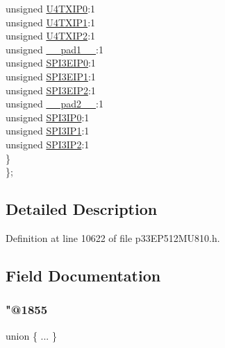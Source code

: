 \begin{DoxyCompactItemize}
\begin{tabbing}
\>\>unsigned \hyperlink{structtag_i_p_c22_b_i_t_s_a85fc1a35056957cd0698f120766a5260}{U4TXIP0}:1\\
\>\>unsigned \hyperlink{structtag_i_p_c22_b_i_t_s_a0818894982fdd0ef5b71a633006c59a1}{U4TXIP1}:1\\
\>\>unsigned \hyperlink{structtag_i_p_c22_b_i_t_s_af0e3e8902eb98b10e5a62a28d39ac00f}{U4TXIP2}:1\\
\>\>unsigned \hyperlink{structtag_i_p_c22_b_i_t_s_acaf2d0924a107ec6e8d2e31febaf66f9}{\_\_pad1\_\_}:1\\
\>\>unsigned \hyperlink{structtag_i_p_c22_b_i_t_s_a724371bf761601c78815e59ddc258fd4}{SPI3EIP0}:1\\
\>\>unsigned \hyperlink{structtag_i_p_c22_b_i_t_s_ab189c8f81fd36a61dabd19e041f3e216}{SPI3EIP1}:1\\
\>\>unsigned \hyperlink{structtag_i_p_c22_b_i_t_s_afbffdd6cbe3ce24cee82fbb3d0765286}{SPI3EIP2}:1\\
\>\>unsigned \hyperlink{structtag_i_p_c22_b_i_t_s_a4d97cc5f7d51d22fc2bf3eab35c9cb7f}{\_\_pad2\_\_}:1\\
\>\>unsigned \hyperlink{structtag_i_p_c22_b_i_t_s_adff7491ec928183bfa3e1ffeae970c58}{SPI3IP0}:1\\
\>\>unsigned \hyperlink{structtag_i_p_c22_b_i_t_s_a730766c73edf93065a1361b4aaa89e2f}{SPI3IP1}:1\\
\>\>unsigned \hyperlink{structtag_i_p_c22_b_i_t_s_a0db78241878da4c171f4bf128bd2d79a}{SPI3IP2}:1\\
\>\} \\
\}; \\

\end{tabbing}\end{DoxyCompactItemize}


\subsection{Detailed Description}


Definition at line 10622 of file p33\+E\+P512\+M\+U810.\+h.



\subsection{Field Documentation}
\mbox{\label{structtag_i_p_c22_b_i_t_s_a5aa42990cc82273d4be26c50a1ee7bf1}} 
\subsubsection{\texorpdfstring{"@1855}{@1855}}
{\footnotesize\ttfamily union \{ ... \} }


